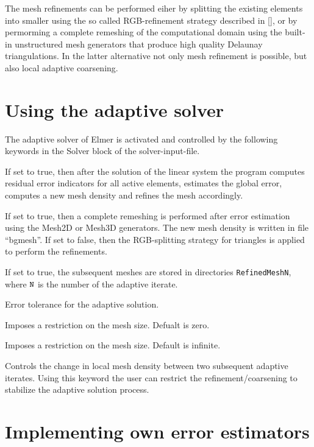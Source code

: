 The mesh refinements can be performed eiher by splitting the existing
elements into smaller using the so called RGB-refinement strategy described
in [], or by permorming a complete remeshing of the computational domain using
the built-in unstructured mesh generators that produce high quality Delaunay
triangulations. In the latter alternative not only mesh refinement is
possible, but also local adaptive coarsening.

\section{Using the adaptive solver}

The adaptive solver of Elmer is activated and controlled by the
following keywords in the Solver block of the solver-input-file.

\sifbegin

 If set to true, then after
the solution of the linear system the program computes residual error
indicators for all active elements, estimates the global error, 
computes a new mesh density and refines the mesh accordingly.

 If set to true, then a complete
remeshing is performed after error estimation using the Mesh2D or
Mesh3D generators. The new mesh density is written in file ``bgmesh''. 
If set to false, then the RGB-splitting strategy for triangles is
applied to perform the refinements.

 If set to true, the subsequent
meshes are stored in directories {\tt RefinedMeshN}, where $\tt N$
is the number of the adaptive iterate.

 Error tolerance for the adaptive
solution.

 Imposes a restriction on the mesh size.
Defualt is zero.

 Imposes a restriction on the mesh size.
Default is infinite.

 Controls the change in local
mesh density between two subsequent adaptive iterates. Using this 
keyword the user can restrict the refinement/coarsening to stabilize
the adaptive solution process. 

\sifend

\section{Implementing own error estimators}

